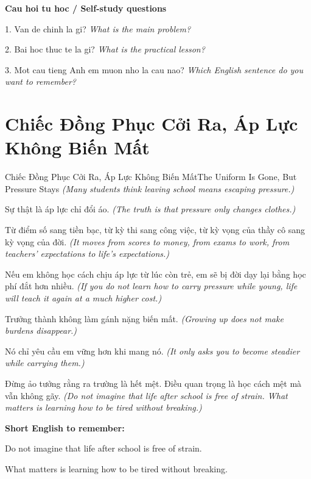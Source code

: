 \begin{tuhocnhanh}
\textbf{Cau hoi tu hoc / Self-study questions}

1. Van de chinh la gi? \textit{What is the main problem?}

2. Bai hoc thuc te la gi? \textit{What is the practical lesson?}

3. Mot cau tieng Anh em muon nho la cau nao? \textit{Which English sentence do you want to remember?}
\end{tuhocnhanh}
\ngancach

\section{Chiếc Đồng Phục Cởi Ra, Áp Lực Không Biến Mất}
\begin{truyen}{Chiếc Đồng Phục Cởi Ra, Áp Lực Không Biến Mất}{The Uniform Is Gone, But Pressure Stays}
\textit{(Many students think leaving school means escaping pressure.)}

Sự thật là áp lực chỉ đổi áo.
\textit{(The truth is that pressure only changes clothes.)}

Từ điểm số sang tiền bạc, từ kỳ thi sang công việc, từ kỳ vọng của thầy cô sang kỳ vọng của đời.
\textit{(It moves from scores to money, from exams to work, from teachers’ expectations to life’s expectations.)}

Nếu em không học cách chịu áp lực từ lúc còn trẻ, em sẽ bị đời dạy lại bằng học phí đắt hơn nhiều.
\textit{(If you do not learn how to carry pressure while young, life will teach it again at a much higher cost.)}

Trưởng thành không làm gánh nặng biến mất.
\textit{(Growing up does not make burdens disappear.)}

Nó chỉ yêu cầu em vững hơn khi mang nó.
\textit{(It only asks you to become steadier while carrying them.)}

\end{truyen}

\begin{baihoc}
Đừng ảo tưởng rằng ra trường là hết mệt. Điều quan trọng là học cách mệt mà vẫn không gãy.
\textit{(Do not imagine that life after school is free of strain. What matters is learning how to be tired without breaking.)}
\end{baihoc}

\begin{ghinhoanh}
\textbf{Short English to remember:}

Do not imagine that life after school is free of strain.

What matters is learning how to be tired without breaking.

\end{ghinhoanh}

